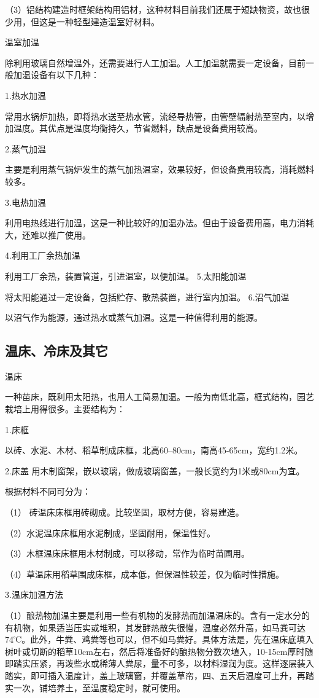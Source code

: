 \documentclass{ctexbook}
\begin{document}
（3）铝结构建造时框架结构用铝材，这种材料目前我们还属于短缺物资，故也很少用，但这是一种轻型建造温室好材料。

温室加温

除利用玻璃自然增温外，还需要进行人工加温。人工加温就需要一定设备，目前一般加温设备有以下几种：

1.热水加温

常用水锅炉加热，即将热水送至热水管，流经导热管，由管壁辐射热至室内，以增加温度。其优点是温度均衡持久，节省燃料，缺点是设备费用较高。

2.蒸气加温

主要是利用蒸气锅炉发生的蒸气加热温室，效果较好，但设备费用较高，消耗燃料较多。

3.电热加温

利用电热线进行加温，这是一种比较好的加温办法。但由于设备费用高，电力消耗大，还难以推广使用。

4.利用工厂余热加温

利用工厂余热，装置管道，引进温室，以便加温。
5.太阳能加温

将太阳能通过一定设备，包括贮存、散热装置，进行室内加温。
6.沼气加温

以沼气作为能源，通过热水或蒸气加温。这是一种值得利用的能源。
\subsection{温床、冷床及其它}
温床

一种苗床，既利用太阳热，也用人工简易加温。一般为南低北高，框式结构，园艺栽培上用得很多。主要结构为：

1.床框

以砖、水泥、木材、稻草制成床框，北高60--80cm，南高45-65cm，宽约1.2米。

2.床盖
用木制窗架，嵌以玻璃，做成玻璃窗盖，一般长宽约为1米或80cm为宜。

根据材料不同可分为：

（1）	砖温床床框用砖砌成。比较坚固，取材方便，容易建造。

（2）水泥温床床框用水泥制成，坚固耐用，保温性好。

（3）木框温床床框用木材制成，可以移动，常作为临时苗圃用。

（4）草温床用稻草围成床框，成本低，但保温性较差，仅为临时性措施。

3.温床加温方法

（1）酿热物加温主要是利用一些有机物的发酵热而加温温床的。含有一定水分的有机物，如果适当压实或堆积，其发酵热散失很慢，温度必然升高，如马粪可达74℃。此外，牛粪、鸡粪等也可以，但不如马粪好。具体方法是，先在温床底填入树叶或切断的稻草10cm左右，然后将准备好的酿热物分数次埴入，10-15cm厚时随即踏实压紧，再泼些水或稀薄人粪尿，量不可多，以材料湿润为度。这样逐层装入踏实，即可插入温度计，盖上玻璃窗，并覆盖草帘，四、五天后温度可上升，再踏实一次，铺培养土，至温度稳定时，就可使用。
\end{document}
